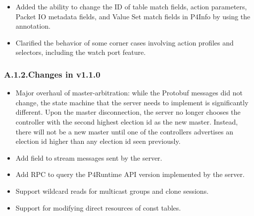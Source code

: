 \documentclass[11pt]{article}
\begin{document}
{\begin{itemize}[noitemsep,topsep=\mdcompacttopsep]
\item{}Added the ability to change the ID of table match fields, action parameters,
Packet IO metadata fields, and Value Set match fields in P4Info by using the
 annotation.%

\item{}Clarified the behavior of some corner cases involving action profiles and
selectors, including the watch port feature.%
\end{itemize}%

\subsubsection{A.1.2.\hspace*{0.5em}Changes in v1.1.0}\label{sec-changes-in-v110}%

\begin{itemize}[noitemsep,topsep=\mdcompacttopsep]%

\item{}Major overhaul of master-arbitration: while the Protobuf messages did not
change, the state machine that the server needs to implement is significantly
different. Upon the master disconnection, the server no longer chooses the
controller with the second highest election id as the new master. Instead,
there will not be a new master until one of the controllers advertises an
election id higher than any election id seen previously.%

\item{}Add  field to stream messages sent by the server.%

\item{}Add  RPC to query the P4Runtime API version implemented by the
server.%

\item{}Support wildcard reads for multicast groups and clone sessions.%

\item{}Support for modifying direct resources of const tables.%


\end{itemize}}
\end{document}
